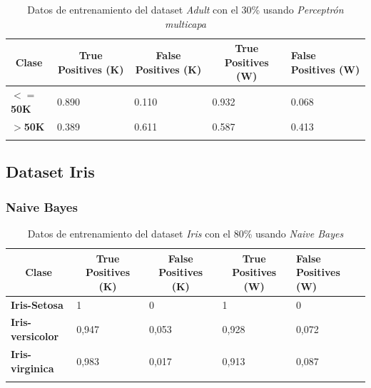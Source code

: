 \documentclass[10pt,a4paper]{article}
\begin{document}
\begin{table}[h!]
\begin{tabular}{lllll}
\hline
\multicolumn{1}{|c|}{\textbf{Clase}} & \multicolumn{1}{c|}{\textbf{True Positives (K)}} & \multicolumn{1}{c|}{\textbf{False Positives (K)}} & \multicolumn{1}{c|}{\textbf{True Positives (W)}} & \multicolumn{1}{l|}{\textbf{False Positives (W)}} \\ \hline
\multicolumn{1}{|l|}{\textbf{$<=$50K}} & \multicolumn{1}{l|}{0.890}          & \multicolumn{1}{l|}{0.110}          & \multicolumn{1}{l|}{0.932}          & \multicolumn{1}{l|}{0.068} \\ \hline
\multicolumn{1}{|l|}{\textbf{$>$50K}} & \multicolumn{1}{l|}{0.389}          & \multicolumn{1}{l|}{0.611}          & \multicolumn{1}{l|}{0.587}          & \multicolumn{1}{l|}{0.413} \\ \hline
\textbf{}                       &                                &                                &                                &                      
\end{tabular}
\caption{Datos de entrenamiento del dataset \emph{Adult} con el 30\% usando \emph{Perceptrón multicapa}}
\label{tab:adult_perceptron_30}
\end{table}

\newpage
\subsection{Dataset Iris}
\subsubsection{Naive Bayes}
\begin{table}[h!]
	\begin{tabular}{lllll}
		\hline
		\multicolumn{1}{|c|}{\textbf{Clase}} & \multicolumn{1}{c|}{\textbf{True Positives (K)}} & \multicolumn{1}{c|}{\textbf{False Positives (K)}} & \multicolumn{1}{c|}{\textbf{True Positives (W)}} & \multicolumn{1}{l|}{\textbf{False Positives (W)}} \\ \hline
		\multicolumn{1}{|l|}{\textbf{Iris-Setosa}} & \multicolumn{1}{l|}{1}          & \multicolumn{1}{l|}{0}          & \multicolumn{1}{l|}{1}          & \multicolumn{1}{l|}{0} \\ \hline
		\multicolumn{1}{|l|}{\textbf{Iris-versicolor}} & \multicolumn{1}{l|}{0,947}          & \multicolumn{1}{l|}{0,053}          & \multicolumn{1}{l|}{0,928}          & \multicolumn{1}{l|}{0,072} \\ \hline
		\multicolumn{1}{|l|}{\textbf{Iris-virginica}} & \multicolumn{1}{l|}{0,983}          & \multicolumn{1}{l|}{0,017}          & \multicolumn{1}{l|}{0,913}          & \multicolumn{1}{l|}{0,087}\\ \hline
		\textbf{}                       &                                &                                &                                &                      
 
	\end{tabular}
	\caption{Datos de entrenamiento del dataset \emph{Iris} con el 80\% usando \emph{Naive Bayes}}
	\label{tab:iris_bayes_80}
\end{table}
\end{document}
